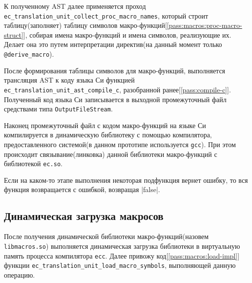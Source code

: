К полученному AST далее применяется проход \verb|ec_translation_unit_collect_proc_macro_names|, 
который строит таблицу(заполняет) таблицу символов макро-функций[\ref{pass:macros:proc-macro-struct}], 
собирая имена макро-функций и имена символов, реализующие их.
Делает она это путем интерпретации директив(на данный момент только \verb|@derive_macro|).

После формирования таблицы символов для макро-функций, выполняется трансляция AST к коду языка Си функцией \verb|ec_translation_unit_ast_compile_c|, 
разобранной ранее[\ref{pass:compile-c}]. Полученный код языка Си записывается в выходной промежуточный файл средствами типа \verb|OutputFileStream|.

Наконец промежуточный файл с кодом макро-функций на языке Си компилируется в динамическую библиотеку с помощью компилятора, 
предоставленного системой(в данном прототипе используется \verb|gcc|).
При этом происходит связывание(линковка) данной библиотеки макро-функций с библиотекой \verb|ec.so|.

Если на каком-то этапе выполнения некоторая подфункция вернет ошибку, то вся функция возвращается с ошибкой, возвращая |false|.

\subsection{Динамическая загрузка макросов}
\label{pass:macros:load}

После получения динамической библиотеки макро-функций(назовем \verb|libmacros.so|) выполняется динамическая загрузка библиотеки в виртуальную память процесса компилятора \verb|ecc|.
Далее привожу код[\ref{pass:macros:load-impl}] функции \verb|ec_translation_unit_load_macro_symbols|, выполняющей данную операцию. 

